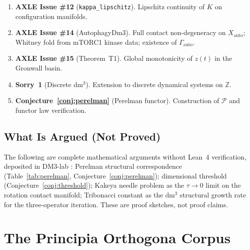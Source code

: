 \documentclass[12pt,a4paper]{article}
\begin{document}
\begin{enumerate}[label=\textbf{O\arabic*.},leftmargin=3em]
  \item \textbf{AXLE Issue \#12} (\texttt{kappa\_lipschitz}).
    Lipschitz continuity of $K$ on configuration manifolds.
  \item \textbf{AXLE Issue \#14} (AutophagyDm3).
    Full contact non-degeneracy on $X_\mathrm{auto}$;
    Whitney fold from mTORC1 kinase data;
    existence of $\Gamma_\mathrm{auto}$.
  \item \textbf{AXLE Issue \#15} (Theorem~T1).
    Global monotonicity of $z(t)$ in the Gronwall basin.
  \item \textbf{Sorry~1} (Discrete dm$^3$).
    Extension to discrete dynamical systems on $\mathbb{Z}$.
  \item \textbf{Conjecture~\ref{conj:perelman}} (Perelman functor).
    Construction of $\mathcal{P}$ and functor law verification.
\end{enumerate}

\subsection{What Is Argued (Not Proved)}

The following are complete mathematical arguments without Lean~4
verification, deposited in DM3-lab \cite{DM3lab2026}:
Perelman structural correspondence
(Table~\ref{tab:perelman}, Conjecture~\ref{conj:perelman});
dimensional threshold
(Conjecture~\ref{conj:threshold});
Kakeya needle problem as the $\tau \to 0$ limit on the rotation
contact manifold;
Tribonacci constant as the dm$^3$ structural growth rate for the
three-operator iteration.
These are proof sketches, not proof claims.

\section{The Principia Orthogona Corpus}
\label{sec:corpus}
\end{document}
